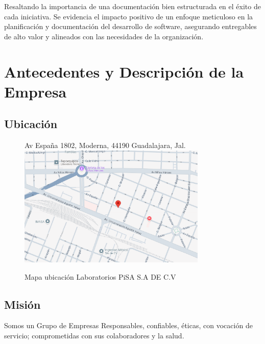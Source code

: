 \documentclass[12pt,letterpaper,spanish, xcolor=table]{report}
\numberwithin{figure}{subsection}
\begin{document}
Resaltando la importancia de una documentación bien estructurada en el éxito de cada iniciativa. Se evidencia el impacto positivo de un enfoque meticuloso en la planificación y documentación del desarrollo de software, asegurando entregables de alto valor y alineados con las necesidades de la organización.\\




\chapter{Antecedentes y Descripción de la Empresa}
\newpage



\section{Ubicación}
	
\begin{figure}[htp]
	\centering
	Av España 1802, Moderna, 44190 Guadalajara, Jal.
	\includegraphics[width=0.8\textwidth]{Imagenes/ubicacion.png}
	\caption{Mapa ubicación Laboratorios PiSA S.A DE C.V}\label{a1}
\end{figure}




\section{Misión}
Somos un Grupo de Empresas Responsables, confiables, éticas, con vocación de servicio; comprometidas con sus colaboradores y la salud.
\end{document}
